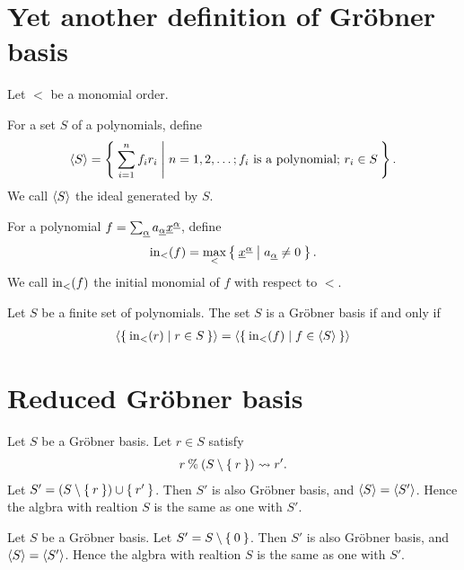 \section{Yet another definition of Gr\"obner basis}
Let $<$ be a monomial order.
\begin{definition}
  For a set $S$ of a polynomials,
  define 
  \begin{align*}
    \Braket{S}=
    \Set{\sum_{i=1}^nf_ir_i|
      n=1,2,\ldots;
      \text{$f_i$ is a polynomial; }
      r_i\in S
    }.
  \end{align*}
  We call $\Braket{S}$
  the ideal  generated by $S$.
\end{definition}

\begin{definition}
  For a polynomial $f=\sum_\aaalpha a_\aaalpha \xxx^\aaalpha$,
  define 
  \begin{align*}
    \initial[<](f)=\max_<\Set{\xxx^\aaalpha|a_\aaalpha\neq 0}.
  \end{align*}
  We call $\initial[<](f)$
  the initial monomial of $f$ with respect to $<$.
\end{definition}

\begin{theorem}
  Let $S$ be a finite set of polynomials.
  The set $S$ is a Gr\"obner basis
  if and only if
  \begin{align*}
    \Braket{\Set{\initial[<](r)|r\in S}}
    =\Braket{\Set{\initial[<](f)|f\in \braket{S}}}
  \end{align*}
\end{theorem}

\section{Reduced Gr\"obner basis}
\begin{lemma}
  Let $S$ be a Gr\"obner basis.
  Let $r\in S$ satisfy
  \begin{align*}
    r\modulo (S\setminus\Set{r})\leadsto r'.
  \end{align*}
  Let $S'=(S\setminus\Set{r})\cup \Set{r'}$.
  Then
  $S'$ is also Gr\"obner basis,
  and $\Braket{S}=\Braket{S'}$.
  Hence the algbra with realtion $S$
  is the same as one with $S'$.
\end{lemma}

\begin{lemma}
  Let $S$ be a Gr\"obner basis.
  Let $S'=S\setminus \Set{0}$.
  Then
  $S'$ is also Gr\"obner basis,
  and $\Braket{S}=\Braket{S'}$.
  Hence the algbra with realtion $S$
  is the same as one with $S'$.
\end{lemma}


